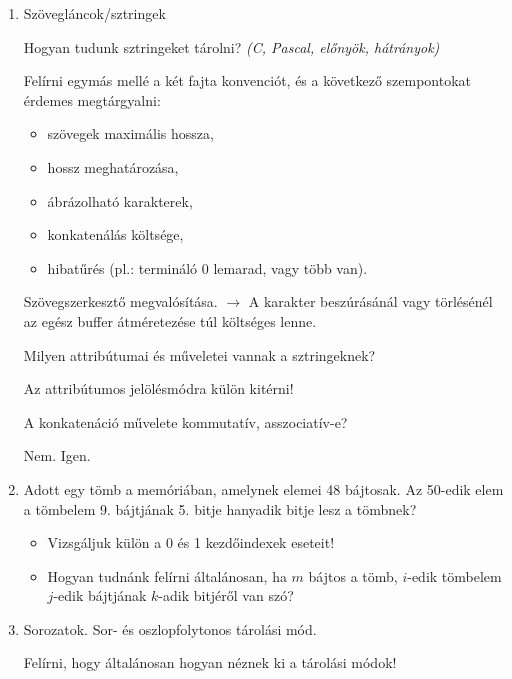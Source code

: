 \documentclass[a4paper]{article}
\newenvironment{solution}
{\color{RoyalBlue}}{\bigskip}
\begin{document}
\begin{enumerate}
\item

Szövegláncok/sztringek

Hogyan tudunk sztringeket tárolni? \textit{(C, Pascal, előnyök, hátrányok)}

\begin{solution}
Felírni egymás mellé a két fajta konvenciót, és a következő szempontokat érdemes megtárgyalni:
\begin{itemize}
\item szövegek maximális hossza,
\item hossz meghatározása,
\item ábrázolható karakterek,
\item konkatenálás költsége,
\item hibatűrés (pl.: termináló 0 lemarad, vagy több van).
\end{itemize}

Szövegszerkesztő megvalósítása. $\rightarrow$ A karakter beszúrásánál vagy törlésénél az egész buffer átméretezése túl költséges lenne.
\end{solution}

Milyen attribútumai és műveletei vannak a sztringeknek?

\begin{solution}
Az attribútumos jelölésmódra külön kitérni!
\end{solution}

A konkatenáció művelete kommutatív, asszociatív-e?

\begin{solution}
Nem. Igen.
\end{solution}

\item

Adott egy tömb a memóriában, amelynek elemei 48 bájtosak. Az 50-edik elem a tömbelem 9. bájtjának 5. bitje hanyadik bitje lesz a tömbnek?
\begin{itemize}
	\item Vizsgáljuk külön a 0 és 1 kezdőindexek eseteit!
	\item Hogyan tudnánk felírni általánosan, ha $m$ bájtos a tömb, $i$-edik tömbelem $j$-edik bájtjának $k$-adik bitjéről van szó?
\end{itemize}

\item

Sorozatok. Sor- és oszlopfolytonos tárolási mód.

\begin{solution}
Felírni, hogy általánosan hogyan néznek ki a tárolási módok!


\end{solution}
\end{enumerate}
\end{document}
